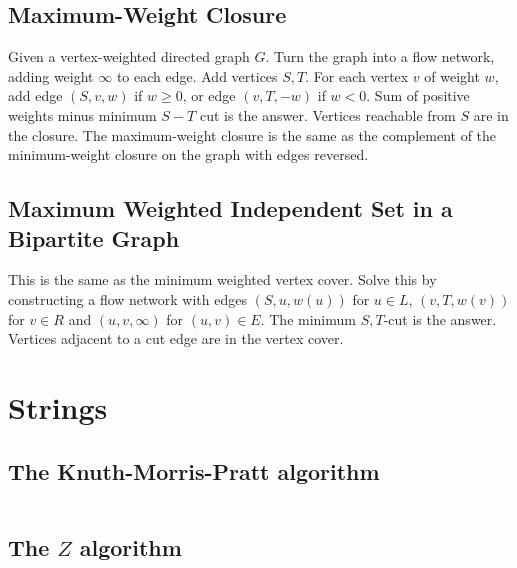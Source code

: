 \documentclass[8pt,a4paper,landscape,oneside]{amsart}
\newcommand{\code}[1]{\inputminted[fontsize=\normalsize,baselinestretch=1]{cpp}{_code/#1}}
\newif\ifverbose
\begin{document}
\begin{multicols*}{3}
    \subsection{Maximum-Weight Closure}
        Given a vertex-weighted directed graph $G$. Turn the graph into a flow
        network, adding weight $\infty$ to each edge. Add vertices $S,T$. For
        each vertex $v$ of weight $w$, add edge $(S,v,w)$ if $w\geq 0$, or edge
        $(v,T,-w)$ if $w<0$. Sum of positive weights minus minimum $S-T$ cut is
        the answer. Vertices reachable from $S$ are in the closure. The
        maximum-weight closure is the same as the complement of the
        minimum-weight closure on the graph with edges reversed.

    \subsection{Maximum Weighted Independent Set in a Bipartite Graph}
        This is the same as the minimum weighted vertex cover. Solve this by
        constructing a flow network with edges $(S,u,w(u))$ for $u\in L$,
        $(v,T,w(v))$ for $v\in R$ and $(u,v,\infty)$ for $(u,v)\in E$. The
        minimum $S,T$-cut is the answer. Vertices adjacent to a cut edge are
        in the vertex cover.

\section{Strings}

    \subsection{The Knuth-Morris-Pratt algorithm}
        \ifverbose
        An implementation of the Knuth-Morris-Pratt algorithm. Runs in $O(n+m)$
        time, where $n$ and $m$ are the lengths of the string and the pattern.
        \fi
        \code{strings/kmp.cpp}

    \subsection{The $Z$ algorithm}
        \ifverbose
        Given a string $S$, $Z_i(S)$ is the longest substring of $S$ starting
        at $i$ that is also a prefix of $S$. The $Z$ algorithm computes these
        $Z$ values in $O(n)$ time, where $n = |S|$. $Z$ values can, for
        example, be used to find all occurrences of a pattern $P$ in a string
        $T$ in linear time. This is accomplished by computing $Z$ values of $S
        = P T$, and looking for all $i$ such that $Z_i \geq |P|$.
        \fi
        \code{strings/z_algorithm.cpp}


\end{multicols*}
\end{document}
